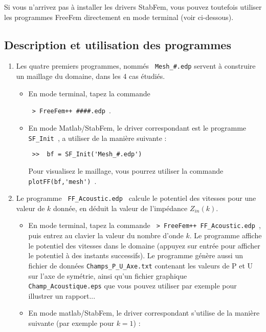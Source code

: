 \documentclass[11pt,a4paper]{article}
\begin{document}
Si vous n'arrivez pas à installer les drivers StabFem, vous pouvez toutefois utiliser les programmes FreeFem directement  en mode terminal (voir ci-dessous).
 
\subsection{Description et utilisation des programmes}


\begin{enumerate}

\item Les quatre premiers programmes, nommés 
\verb| Mesh_#.edp|
 servent à construire un maillage du domaine, dans les 4 cas étudiés.

\begin{itemize}
\item En mode terminal,  tapez la commande 

\verb| > FreeFem++ ####.edp |.

\item En mode Matlab/StabFem, le driver correspondant est le programme \verb| SF_Init |, a utiliser de la manière suivante :
 
\verb| >>  bf = SF_Init('Mesh_#.edp') |

Pour visualisez le maillage, vous pourrez utiliser la commande \verb| plotFF(bf,'mesh') |.
\end{itemize}


 
 \item Le programme \verb| FF_Acoustic.edp | calcule le potentiel des vitesses pour une valeur de $k$ donnée, en déduit la valeur de l'impédance $Z_{in}(k)$. 

\begin{itemize}
\item En mode terminal,  tapez la commande \verb| > FreeFem++ FF_Acoustic.edp |, puis entrez au clavier la valeur du nombre d'onde  $k$. Le programme affiche le potentiel des vitesses dans le domaine (appuyez sur entrée pour afficher le potentiel à des instants successifs). Le programme génère aussi un fichier de données \verb|Champs_P_U_Axe.txt|
contenant les valeurs de P et U sur l'axe de symétrie, ainsi qu'un fichier graphique 
\verb|Champ_Acoustique.eps| que vous pouvez utiliser par exemple pour illustrer un rapport...

\item En mode matlab/StabFem, le driver correspondant s'utilise de la manière suivante (par exemple pour $k=1$) :


\end{itemize}
\end{enumerate}
\end{document}
